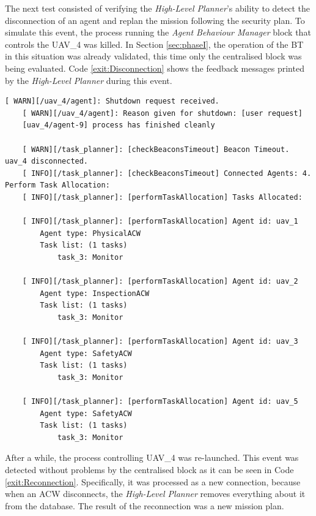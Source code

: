 The next test consisted of verifying the \emph{High-Level Planner}'s ability to detect the disconnection of an agent and replan the mission following the security plan. To simulate this event, the process running the \emph{Agent Behaviour Manager} block that controls the UAV\_4 was killed. In Section \ref{sec:phaseI}, the operation of the \gls{BT} in this situation was already validated, this time only the centralised block was being evaluated. Code \ref{exit:Disconnection} shows the feedback messages printed by the \emph{High-Level Planner} during this event.

\begin{lstlisting}[caption={Feedback messages printed after an \gls{ACW} disconnects}, breaklines=true, label=exit:Disconnection]
    [ WARN][/uav_4/agent]: Shutdown request received.
    [ WARN][/uav_4/agent]: Reason given for shutdown: [user request]
    [uav_4/agent-9] process has finished cleanly
    
    [ WARN][/task_planner]: [checkBeaconsTimeout] Beacon Timeout. uav_4 disconnected.
    [ INFO][/task_planner]: [checkBeaconsTimeout] Connected Agents: 4. Perform Task Allocation:
    [ INFO][/task_planner]: [performTaskAllocation] Tasks Allocated:
    
    [ INFO][/task_planner]: [performTaskAllocation] Agent id: uav_1
        Agent type: PhysicalACW
        Task list: (1 tasks)
            task_3: Monitor
    
    [ INFO][/task_planner]: [performTaskAllocation] Agent id: uav_2
        Agent type: InspectionACW
        Task list: (1 tasks)
            task_3: Monitor
    
    [ INFO][/task_planner]: [performTaskAllocation] Agent id: uav_3
        Agent type: SafetyACW
        Task list: (1 tasks)
            task_3: Monitor
    
    [ INFO][/task_planner]: [performTaskAllocation] Agent id: uav_5
        Agent type: SafetyACW
        Task list: (1 tasks)
            task_3: Monitor
\end{lstlisting}

After a while, the process controlling UAV\_4 was re-launched. This event was detected without problems by the centralised block as it can be seen in Code \ref{exit:Reconnection}. Specifically, it was processed as a new connection, because when an \gls{ACW} disconnects, the \emph{High-Level Planner} removes everything about it from the database. The result of the reconnection was a new mission plan.

